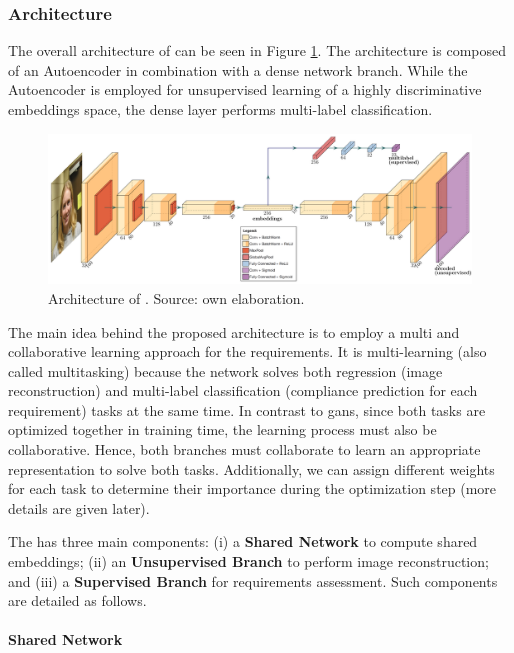 \subsubsection{Architecture}

The overall architecture of \methodname can be seen in Figure \ref{fig:icaonet}. The architecture is composed of an Autoencoder in combination with a dense network branch. While the Autoencoder is employed for unsupervised learning of a highly discriminative embeddings space, the dense layer performs multi-label classification. 

\begin{figure}
\centering
\includegraphics[width=\linewidth]{images/icaonet.pdf}
\caption{Architecture of \methodname. Source: own elaboration.}
\label{fig:icaonet}
\end{figure}

The main idea behind the proposed architecture is to employ a multi and collaborative learning approach for the \icao requirements. It is multi-learning (also called multitasking) because the network solves both regression (image reconstruction) and multi-label classification (compliance prediction for each requirement) tasks at the same time. In contrast to \acfp{gan}, since both tasks are optimized together in training time, the learning process must also be collaborative. Hence, both branches must collaborate to learn an appropriate representation to solve both tasks. Additionally, we can assign different weights for each task to determine their importance during the optimization step (more details are given later).

The \methodname has three main components: (i) a \textbf{Shared Network} to compute shared embeddings; (ii) an \textbf{Unsupervised Branch} to perform image reconstruction; and (iii) a \textbf{Supervised Branch} for requirements assessment. Such components are detailed as follows.

\paragraph{Shared Network}

